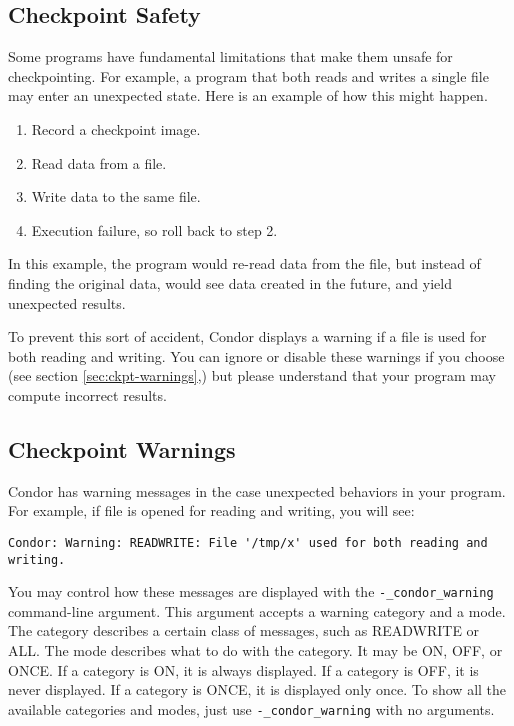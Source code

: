 \subsection{\label{sec:ckpt-safety}Checkpoint Safety}

Some programs have fundamental limitations that make them
unsafe for checkpointing.  For example, a program that both reads
and writes a single file may enter an unexpected state. Here
is an example of how this might happen.

\begin{enumerate}
\item Record a checkpoint image.
\item Read data from a file.
\item Write data to the same file.
\item Execution failure, so roll back to step 2.
\end{enumerate}

In this example, the program would re-read data from the file, but
instead of finding the original data, would see data created in the
future, and yield unexpected results.

To prevent this sort of accident, Condor displays a warning
if a file is used for both reading and writing.  You can ignore or disable
these warnings if you choose (see section \ref{sec:ckpt-warnings},) but
please understand that your program may compute incorrect results.

\subsection{\label{sec:ckpt-warnings}Checkpoint Warnings}

Condor has warning messages in the case unexpected
behaviors in your program.  For example, if file 
is opened for reading
and writing, you will see:

\footnotesize
\begin{verbatim}
Condor: Warning: READWRITE: File '/tmp/x' used for both reading and writing.
\end{verbatim}
\normalsize

You may control how these messages are displayed with the
\verb$-_condor_warning$ command-line argument.  This argument
accepts a warning category and a mode.  The category describes a certain
class of messages, such as READWRITE or ALL.  The mode describes what
to do with the category.  It may be ON, OFF, or ONCE.
If a category is ON, it is always displayed.
If a category is OFF, it is never displayed.
If a category is ONCE, it is displayed only once.
To show all the available categories and modes, just use
\verb$-_condor_warning$ with no arguments.

